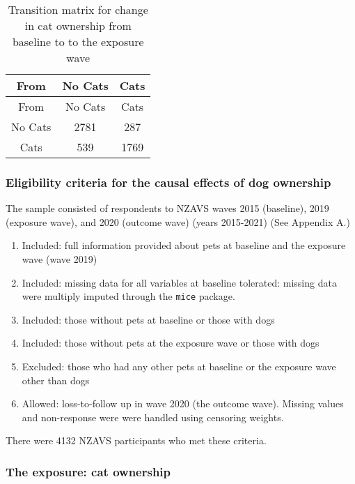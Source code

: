 \documentclass[
  singlecolumn,
  9pt]{article}
\providecommand{\tightlist}{%
  \setlength{\itemsep}{0pt}\setlength{\parskip}{0pt}}\usepackage{longtable,booktabs,array}
\begin{document}
\begin{longtable}[]{@{}ccc@{}}
\caption{Transition matrix for change in cat ownership from baseline to
to the exposure wave}\label{tbl-transition}\tabularnewline
\toprule\noalign{}
From & No Cats & Cats \\
\midrule\noalign{}
\endfirsthead
\toprule\noalign{}
From & No Cats & Cats \\
\midrule\noalign{}
\endhead
\bottomrule\noalign{}
\endlastfoot
No Cats & 2781 & 287 \\
Cats & 539 & 1769 \\
\end{longtable}

\subsubsection{Eligibility criteria for the causal effects of dog
ownership}\label{eligibility-criteria-for-the-causal-effects-of-dog-ownership}

The sample consisted of respondents to NZAVS waves 2015 (baseline), 2019
(exposure wave), and 2020 (outcome wave) (years 2015-2021) (See Appendix
A.)

\begin{enumerate}
\def\labelenumi{\arabic{enumi}.}
\tightlist
\item
  Included: full information provided about pets at baseline and the
  exposure wave (wave 2019)
\item
  Included: missing data for all variables at baseline tolerated:
  missing data were multiply imputed through the \texttt{mice} package.
\item
  Included: those without pets at baseline or those with dogs
\item
  Included: those without pets at the exposure wave or those with dogs
\item
  Excluded: those who had any other pets at baseline or the exposure
  wave other than dogs
\item
  Allowed: loss-to-follow up in wave 2020 (the outcome wave). Missing
  values and non-response were were handled using censoring weights.
\end{enumerate}

There were 4132 NZAVS participants who met these criteria.

\subsubsection{The exposure: cat
ownership}\label{the-exposure-cat-ownership-1}
\end{document}
